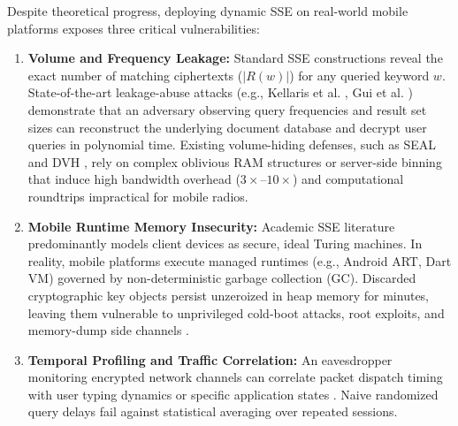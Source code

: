\documentclass[10pt,conference]{IEEEtran}
\begin{document}
Despite theoretical progress, deploying dynamic SSE on real-world mobile platforms exposes three critical vulnerabilities:
\begin{enumerate}
    \item \textbf{Volume and Frequency Leakage:} Standard SSE constructions reveal the exact number of matching ciphertexts ($|R(w)|$) for any queried keyword $w$. State-of-the-art leakage-abuse attacks (e.g., Kellaris et al. \cite{kellaris2016}, Gui et al. \cite{gui2019volume}) demonstrate that an adversary observing query frequencies and result set sizes can reconstruct the underlying document database and decrypt user queries in polynomial time. Existing volume-hiding defenses, such as SEAL \cite{demertzis2020seal} and DVH \cite{patel2023dvh}, rely on complex oblivious RAM structures or server-side binning that induce high bandwidth overhead ($3\times$--$10\times$) and computational roundtrips impractical for mobile radios.
    \item \textbf{Mobile Runtime Memory Insecurity:} Academic SSE literature predominantly models client devices as secure, ideal Turing machines. In reality, mobile platforms execute managed runtimes (e.g., Android ART, Dart VM) governed by non-deterministic garbage collection (GC). Discarded cryptographic key objects persist unzeroized in heap memory for minutes, leaving them vulnerable to unprivileged cold-boot attacks, root exploits, and memory-dump side channels \cite{kocher1996,rustee2020}.
    \item \textbf{Temporal Profiling and Traffic Correlation:} An eavesdropper monitoring encrypted network channels can correlate packet dispatch timing with user typing dynamics or specific application states \cite{swat2024}. Naive randomized query delays fail against statistical averaging over repeated sessions.
\end{enumerate}
\end{document}
